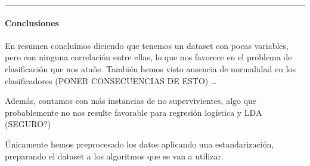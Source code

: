 \documentclass[
]{article}
\begin{document}
\begin{center}\rule{0.5\linewidth}{0.5pt}\end{center}

\hypertarget{conclusiones}{%
\paragraph{Conclusiones}\label{conclusiones}}

En resumen concluímos diciendo que tenemos un dataset con pocas
variables, pero con ninguna correlación entre ellas, lo que nos favorece
en el problema de clasificación que nos atañe. También hemos visto
ausencia de normalidad en los clasificadores (PONER CONSECUENCIAS DE
ESTO) \ldots{}

Además, contamos con más instancias de no supervivientes, algo que
probablemente no nos resulte favorable para regresión logística y LDA
(SEGURO?)

Únicamente hemos preprocesado los datos aplicando una estandarización,
preparando el dataset a los algoritmos que se van a utilizar.
\end{document}
